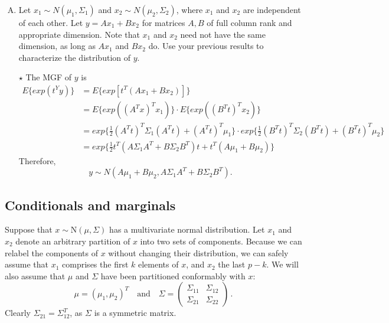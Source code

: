 \documentclass[11pt]{article}
\newcommand{\jie}{$\star$ }
\newcommand{\half}{\frac{1}{2}}
\newcommand{\N}{\mbox{N}}
\begin{document}
\begin{enumerate}[(A)]
\item Let $x_1 \sim N(\mu_1, \Sigma_1)$ and $x_2 \sim N(\mu_2, \Sigma_2)$, where $x_1$ and $x_2$ are independent of each other.  Let $y = A x_1 + B x_2$ for matrices $A,B$ of full column rank and appropriate dimension.  Note that $x_1$ and $x_2$ need not have the same dimension, as long as $A x_1$ and $B x_2$ do.  Use your previous results to characterize the distribution of $y$.

\bigskip

\jie
The MGF of $y$ is
\begin{align*}
    E\{exp(t^Y y)\} &= E\{exp[t^T(Ax_1 + Bx_2)]\} \\
    & = E\{exp((A^T x)^T x_1)\} \cdot E\{exp((B^Tt)^Tx_2)\} \\
    &= exp\{ \half (A^Tt)^T\Sigma_1(A^Tt) + (A^Tt)^T\mu_1 \} \cdot 
    exp\{ \half (B^Tt)^T\Sigma_2(B^Tt) + (B^Tt)^T\mu_2 \} \\
    &= exp \{\half t^T(A\Sigma_1A^T + B\Sigma_2B^T)t + t^T(A\mu_1+B\mu_2) \}
\end{align*}
Therefore,
$$y \sim N(A\mu_1+B\mu_2, A\Sigma_1A^T + B\Sigma_2B^T).$$

\bigskip

\end{enumerate}

\subsection{Conditionals and marginals}

Suppose that $x \sim \N(\mu, \Sigma)$ has a multivariate normal distribution.  Let $x_1$ and $x_2$ denote an arbitrary partition of $x$ into two sets of components.  Because we can relabel the components of $x$ without changing their distribution, we can safely assume that $x_1$ comprises the first $k$ elements of $x$, and $x_2$ the last $p-k$.  We will also assume that $\mu$ and $\Sigma$ have been partitioned conformably with $x$:
$$
\mu = (\mu_1, \mu_2)^T \quad \mbox{and} \quad \Sigma =
\left(
\begin{array}{cc}
\Sigma_{11} & \Sigma_{12} \\
\Sigma_{21} & \Sigma_{22} 
\end{array}
\right) \, .
$$
Clearly $\Sigma_{21} = \Sigma_{12}^T$, as $\Sigma$ is a symmetric matrix.
\end{document}
